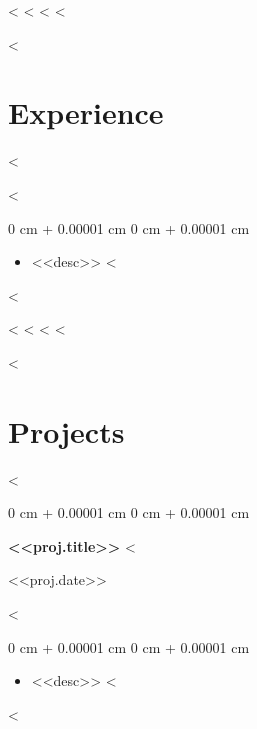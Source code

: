 \documentclass[10pt, letterpaper]{article}
\newenvironment{highlights}{
    \begin{itemize}[
        topsep=0.10 cm,
        parsep=0.10 cm,
        partopsep=0pt,
        itemsep=0pt,
        leftmargin=0 cm + 10pt
    ]
}{
    \end{itemize}
} %
\newenvironment{onecolentry}{
    \begin{adjustwidth}{
        0 cm + 0.00001 cm
    }{
        0 cm + 0.00001 cm
    }
}{
    \end{adjustwidth}
} %
\newenvironment{twocolentry}[2][]{
    \onecolentry
    \def\secondColumn{#2}
    \setcolumnwidth{\fill, 4.5 cm}
    \begin{paracol}{2}
}{
    \switchcolumn \raggedleft \secondColumn
    \end{paracol}
    \endonecolentry
} %
\begin{document}
        <%
        \vspace{0.2cm}
        <%
    <%
    <%

    <%
    \section{Experience}
    <%

        <%
        \vspace{0.10cm}
        \begin{onecolentry}
            \begin{highlights}
                <%
                \item <<desc>>
                <%
            \end{highlights}
        \end{onecolentry}
        <%

        <%
        \vspace{0.2cm}
        <%
    <%
    <%

    <%
    \section{Projects}
    <%
        \begin{twocolentry}{<<proj.date>>}
            \textbf{<<proj.title>>} <%
        \end{twocolentry}

        <%
        \vspace{0.10cm}
        \begin{onecolentry}
            \begin{highlights}
                <%
                \item <<desc>>
                <%
            \end{highlights}
        \end{onecolentry}
        <%
\end{document}
